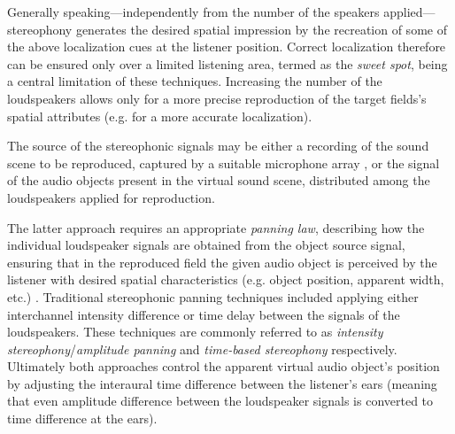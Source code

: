 Generally speaking---independently from the number of the speakers applied---stereophony generates the desired spatial impression by the recreation of some of the above localization cues at the listener position.
Correct localization therefore can be ensured only over a limited listening area, termed as the \emph{sweet spot}, being a central limitation of these techniques.
Increasing the number of the loudspeakers allows only for a more precise reproduction of the target fields's spatial attributes (e.g. for a more accurate localization).

The source of the stereophonic signals may be either a recording of the sound scene to be reproduced, captured by a suitable microphone array \cite{lipshitz1985stereo, williams1999microphone, wittek2017development}, or the signal of the audio objects present in the virtual sound scene, distributed among the loudspeakers applied for reproduction.

The latter approach requires an appropriate \emph{panning law}, describing how the individual loudspeaker signals are obtained from the object source signal, ensuring that in the reproduced field the given audio object is perceived by the listener with desired spatial characteristics (e.g. object position, apparent width, etc.) \cite{Pulkki2001a, Pulkki2001b}.
Traditional stereophonic panning techniques included applying either interchannel intensity difference or time delay between the signals of the loudspeakers.
These techniques are commonly referred to as \emph{intensity stereophony}/\emph{amplitude panning} and \emph{time-based stereophony} respectively.
Ultimately both approaches control the apparent virtual audio object's position by adjusting the interaural time difference between the listener's ears (meaning that even amplitude difference between the loudspeaker signals is converted to time difference at the ears).

